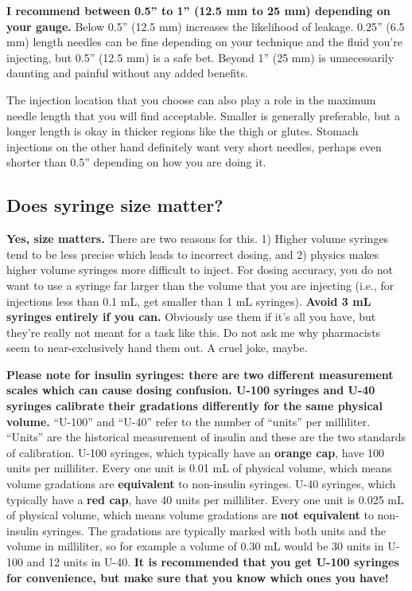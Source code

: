 \documentclass{article}
\begin{document}
\textbf{I recommend between 0.5” to 1” (12.5 mm to 25 mm) depending on your gauge.} Below 0.5” (12.5 mm) increases the likelihood of leakage. 0.25” (6.5 mm) length needles can be fine depending on your technique and the fluid you’re injecting, but 0.5” (12.5 mm) is a safe bet. Beyond 1” (25 mm) is unnecessarily daunting and painful without any added benefits.

The injection location that you choose can also play a role in the maximum needle length that you will find acceptable. Smaller is generally preferable, but a longer length is okay in thicker regions like the thigh or glutes. Stomach injections on the other hand definitely want very short needles, perhaps even shorter than 0.5” depending on how you are doing it.

\subsection{Does syringe size matter?}\label{5-18}

\textbf{Yes, size matters.} There are two reasons for this. 1) Higher volume syringes tend to be less precise which leads to incorrect dosing, and 2) physics makes higher volume syringes more difficult to inject. For dosing accuracy, you do not want to use a syringe far larger than the volume that you are injecting (i.e., for injections less than 0.1 mL, get smaller than 1 mL syringes). \textbf{Avoid 3 mL syringes entirely if you can.} Obviously use them if it’s all you have, but they’re really not meant for a task like this. Do not ask me why pharmacists seem to near-exclusively hand them out. A cruel joke, maybe.

\textbf{Please note for insulin syringes: there are two different measurement scales which can cause dosing confusion. U-100 syringes and U-40 syringes calibrate their gradations differently for the same physical volume.} “U-100” and “U-40” refer to the number of “units” per milliliter. “Units” are the historical measurement of insulin and these are the two standards of calibration. U-100 syringes, which typically have an \textbf{orange cap}, have 100 units per milliliter. Every one unit is 0.01 mL of physical volume, which means volume gradations are \textbf{equivalent} to non-insulin syringes. U-40 syringes, which typically have a \textbf{red cap}, have 40 units per milliliter. Every one unit is 0.025 mL of physical volume, which means volume gradations are \textbf{not equivalent} to non-insulin syringes. The gradations are typically marked with both units and the volume in milliliter, so for example a volume of 0.30 mL would be 30 units in U-100 and 12 units in U-40. \textbf{It is recommended that you get U-100 syringes for convenience, but make sure that you know which ones you have!}
\end{document}
